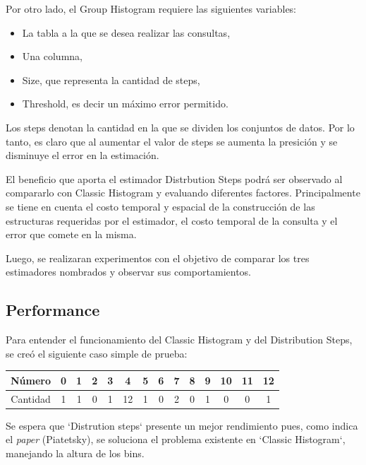 \documentclass[10pt, a4paper,english,spanish,hidelinks]{article}
\begin{document}
Por otro lado, el Group Histogram requiere las siguientes variables:
\begin{itemize}
	\item La tabla a la que se desea realizar las consultas,
	\item Una columna,
  	\item Size, que representa la cantidad de steps,
  	\item Threshold, es decir un máximo error permitido.
\end{itemize}

Los steps denotan la cantidad en la que se dividen los conjuntos de datos. Por lo tanto,
es claro que al aumentar el valor de steps se aumenta la presición y se disminuye el
error en la estimación.

El beneficio que aporta el estimador Distrbution Steps podrá ser observado al compararlo
con Classic Histogram y evaluando diferentes factores. Principalmente se tiene en cuenta
el costo temporal y espacial de la construcción de las estructuras requeridas por el
estimador, el costo temporal de la consulta y el error que comete en la misma.

Luego, se realizaran experimentos con el objetivo de comparar los tres estimadores nombrados y observar sus comportamientos. 
\newpage
\subsection{Performance}
Para entender el funcionamiento del Classic Histogram y del Distribution Steps, se creó el siguiente caso simple de prueba:

\begin{table}[htdp]
  \begin{center}
    \begin{tabular}{|c|c|c|c|c|c|c|c|c|c|c|c|c|c|} \hline
       Número  & 0 & 1 & 2 & 3 & 4 & 5 & 6 & 7 & 8 & 9 & 10 & 11 & 12 \\ \hline
       Cantidad & 1 & 1 & 0 & 1 & 12 & 1 & 0 & 2 & 0 & 1 & 0 & 0 & 1 \\ \hline
    \end{tabular}
  \end{center}
\end{table}


Se espera que `Distrution steps` presente un mejor rendimiento pues, como indica el \textit{paper} (Piatetsky),
se soluciona el problema existente en `Classic Histogram`, manejando la altura
de los bins.
\end{document}
